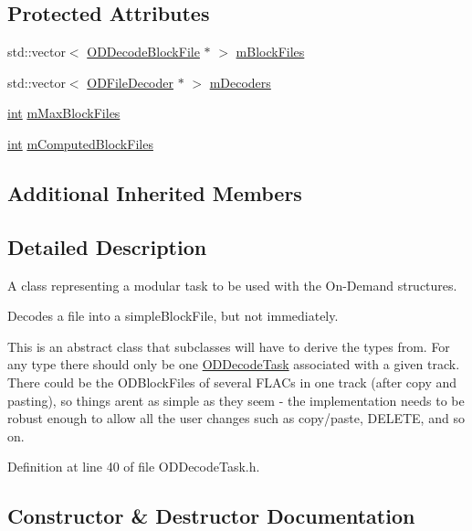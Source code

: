 \subsection*{Protected Attributes}
\begin{DoxyCompactItemize}
\item 
std\+::vector$<$ \hyperlink{class_o_d_decode_block_file}{O\+D\+Decode\+Block\+File} $\ast$ $>$ \hyperlink{class_o_d_decode_task_a920d4e6297a7996e6e5a8529e98167ee}{m\+Block\+Files}
\item 
std\+::vector$<$ \hyperlink{class_o_d_file_decoder}{O\+D\+File\+Decoder} $\ast$ $>$ \hyperlink{class_o_d_decode_task_a1bf85af941ecc998eae165c44cf32c71}{m\+Decoders}
\item 
\hyperlink{xmltok_8h_a5a0d4a5641ce434f1d23533f2b2e6653}{int} \hyperlink{class_o_d_decode_task_a9bbae0e983f08ee5a2185f6309b1c144}{m\+Max\+Block\+Files}
\item 
\hyperlink{xmltok_8h_a5a0d4a5641ce434f1d23533f2b2e6653}{int} \hyperlink{class_o_d_decode_task_a46c66f8053205cb4791b36d5f692a83e}{m\+Computed\+Block\+Files}
\end{DoxyCompactItemize}
\subsection*{Additional Inherited Members}


\subsection{Detailed Description}
A class representing a modular task to be used with the On-\/\+Demand structures. 

Decodes a file into a simple\+Block\+File, but not immediately.

This is an abstract class that subclasses will have to derive the types from. For any type there should only be one \hyperlink{class_o_d_decode_task}{O\+D\+Decode\+Task} associated with a given track. There could be the O\+D\+Block\+Files of several F\+L\+A\+Cs in one track (after copy and pasting), so things aren\textquotesingle{}t as simple as they seem -\/ the implementation needs to be robust enough to allow all the user changes such as copy/paste, D\+E\+L\+E\+TE, and so on. 

Definition at line 40 of file O\+D\+Decode\+Task.\+h.



\subsection{Constructor \& Destructor Documentation}
